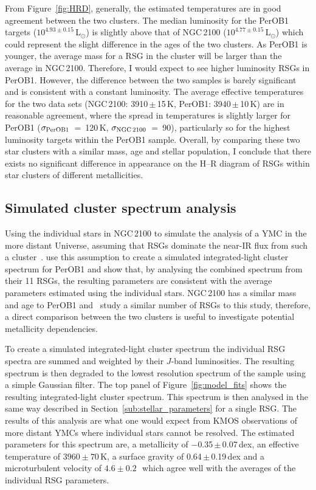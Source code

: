 From Figure~\ref{fig:HRD}, generally, the estimated temperatures are in good agreement between the two clusters.
The median luminosity for the PerOB1 targets ($10^{4.93\pm0.15}\,$L$_{\odot}$) is slightly above that of NGC\,2100 ($10^{4.77\pm0.15}\,$L$_{\odot}$) which could represent the slight difference in the ages of the two clusters.
As PerOB1 is younger, the average mass for a RSG in the cluster will be larger than the average in NGC\,2100.
Therefore, I would expect to see higher luminosity RSGs in PerOB1.
However, the difference between the two samples is barely significant and is consistent with a constant luminosity.
The average effective temperatures for the two data sets (NGC\,2100: 3910\,$\pm$\,15\,K, PerOB1: 3940\,$\pm$\,10\,K) are in reasonable agreement, where the spread in temperatures is slightly larger for PerOB1
($\sigma_{\rm PerOB1}$~=~120\,K, $\sigma_{\rm NGC\,2100}$~=~90),
particularly so for the highest luminosity targets within the PerOB1 sample.
Overall, by comparing these two star clusters with a similar mass, age and stellar population, I conclude that there exists no significant difference in appearance on the H--R diagram of RSGs within star clusters of different metallicities.


\subsection{Simulated cluster spectrum analysis} %
\label{sub:integrated_light_cluster_analysis}

Using the individual stars in NGC\,2100 to simulate the analysis of a YMC in the more distant Universe, assuming that RSGs dominate the near-IR flux from such a cluster~\citep{2013MNRAS.430L..35G}.
\cite{2014ApJ...788...58G} use this assumption to create a simulated integrated-light cluster spectrum for PerOB1 and show that, by analysing the combined spectrum from their 11 RSGs, the resulting parameters are consistent with the average parameters estimated using the individual stars.
NGC\,2100 has a similar mass and age to PerOB1 and~\cite{2014ApJ...788...58G} study a similar number of RSGs to this study,
therefore, a direct comparison between the two clusters is useful to investigate potential metallicity dependencies.

To create a simulated integrated-light cluster spectrum the individual RSG spectra are summed and weighted by their $J$-band luminosities.
The resulting spectrum is then degraded to the lowest resolution spectrum of the sample using a simple Gaussian filter.
The top panel of Figure~\ref{fig:model_fits} shows the resulting integrated-light cluster spectrum.
This spectrum is then analysed in the same way described in Section~\ref{sub:stellar_parameters} for a single RSG.
The results of this analysis are what one would expect from KMOS observations of more distant YMCs where individual stars cannot be resolved.
The estimated parameters for this spectrum are, a metallicity of $-$0.35\,$\pm$\,0.07\,dex, an effective temperature of $3960\pm70\,$K,
a surface gravity of 0.64\,$\pm$\,0.19\,dex and a microturbulent velocity of $4.6\pm0.2\,$\kms~which agree well with the averages of the individual RSG parameters.

